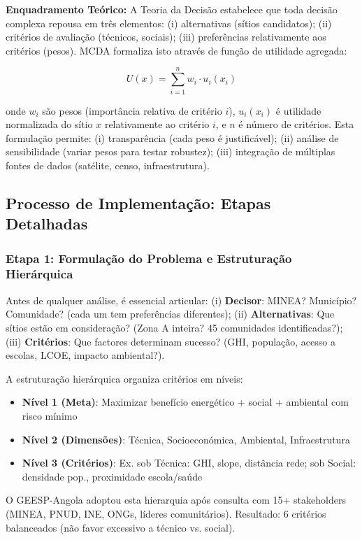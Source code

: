 \documentclass[12pt, a4paper]{article}
\begin{document}
\textbf{Enquadramento Teórico:} A Teoria da Decisão estabelece que toda decisão complexa repousa em três elementos: (i) alternativas (sítios candidatos); (ii) critérios de avaliação (técnicos, sociais); (iii) preferências relativamente aos critérios (pesos). MCDA formaliza isto através de função de utilidade agregada:

\begin{equation}
U(x) = \sum_{i=1}^{n} w_i \cdot u_i(x_i)
\end{equation}

onde $w_i$ são pesos (importância relativa de critério $i$), $u_i(x_i)$ é utilidade normalizada do sítio $x$ relativamente ao critério $i$, e $n$ é número de critérios. Esta formulação permite: (i) transparência (cada peso é justificável); (ii) análise de sensibilidade (variar pesos para testar robustez); (iii) integração de múltiplas fontes de dados (satélite, censo, infraestrutura).

\subsection{Processo de Implementação: Etapas Detalhadas}

\subsubsection{Etapa 1: Formulação do Problema e Estruturação Hierárquica}
Antes de qualquer análise, é essencial articular: (i) 
\textbf{Decisor}: MINEA? Município? Comunidade? (cada um tem preferências diferentes); (ii) 
\textbf{Alternativas}: Que sítios estão em consideração? (Zona A inteira? 45 comunidades identificadas?); (iii) 
\textbf{Critérios}: Que factores determinam sucesso? (GHI, população, acesso a escolas, LCOE, impacto ambiental?).

A estruturação hierárquica organiza critérios em níveis:
\begin{itemize}
\item \textbf{Nível 1 (Meta)}: Maximizar benefício energético + social + ambiental com risco mínimo
\item \textbf{Nível 2 (Dimensões)}: Técnica, Socioeconómica, Ambiental, Infraestrutura
\item \textbf{Nível 3 (Critérios)}: Ex. sob Técnica: GHI, slope, distância rede; sob Social: densidade pop., proximidade escola/saúde
\end{itemize}

O GEESP-Angola adoptou esta hierarquia após consulta com 15+ stakeholders (MINEA, PNUD, INE, ONGs, líderes comunitários). Resultado: 6 critérios balanceados (não favor excessivo a técnico vs. social).
\end{document}
